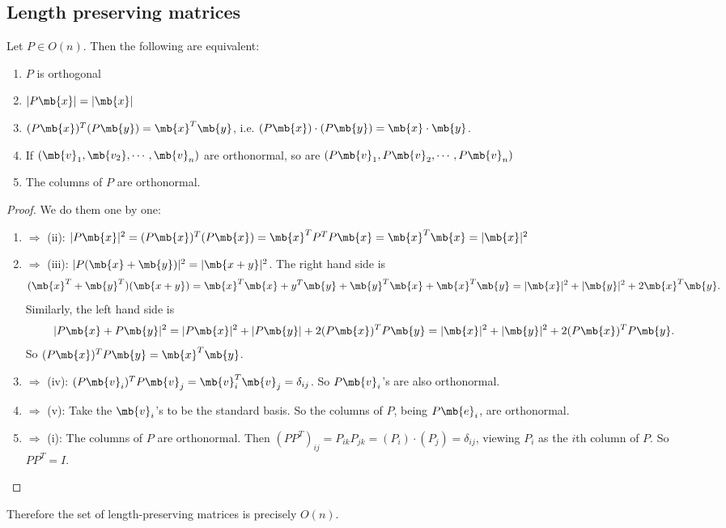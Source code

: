 \documentclass[a4paper]{article}
\begin{document}
\subsection{Length preserving matrices}
\begin{thm}
  Let $P\in O(n)$. Then the following are equivalent:
  \begin{enumerate}
    \item $P$ is orthogonal
    \item $|P\mb{x}| = |\mb{x}|$
    \item $(P\mb{x})^T(P\mb{y}) = \mb{x}^T\mb{y}$, i.e. $(P\mb{x})\cdot(P\mb{y}) = \mb{x}\cdot \mb{y}$.
    \item If $(\mb{v}_1, \mb{v_2}, \cdots, \mb{v}_n)$ are orthonormal, so are $(P\mb{v}_1, P\mb{v}_2, \cdots, P\mb{v}_n)$
    \item The columns of $P$ are orthonormal. 
  \end{enumerate}
\end{thm}

\begin{proof}
  We do them one by one:
  \begin{enumerate}
  \item $\Rightarrow$ (ii): $|P\mb{x}|^2 = (P\mb{x})^T(P\mb{x}) = \mb{x}^TP^TP\mb{x} = \mb{x}^T\mb{x} = |\mb{x}|^2$
  \item $\Rightarrow$ (iii): $|P(\mb{x} + \mb{y})|^2 = |\mb{x + y}|^2$. The right hand side is
    \[
    (\mb{x}^T + \mb{y}^T)(\mb{x + y}) = \mb{x}^T\mb{x} + y^T\mb{y} + \mb{y}^T\mb{x} + \mb{x}^T\mb{y} = |\mb{x}|^2 + |\mb{y}|^2  + 2\mb{x}^T\mb{y}.
    \]
    Similarly, the left hand side is
    \[
    |P\mb{x} + P\mb{y}|^2 = |P\mb{x}|^2 + |P\mb{y}| + 2(P\mb{x})^TP\mb{y} = |\mb{x}|^2 + |\mb{y}|^2 + 2(P\mb{x})^TP\mb{y}.
    \]
    So $(P\mb{x})^TP\mb{y} = \mb{x}^T\mb{y}$.
  \item $\Rightarrow$ (iv): $(P\mb{v}_i)^TP\mb{v}_j = \mb{v}_i^T\mb{v}_j = \delta_{ij}$. So $P\mb{v}_i$'s are also orthonormal.
  \item $\Rightarrow$ (v): Take the $\mb{v}_i$'s to be the standard basis. So the columns of $P$, being $P\mb{e}_i$, are orthonormal.
  \item $\Rightarrow$ (i): The columns of $P$ are orthonormal. Then $(PP^T)_{ij} = P_{ik}P_{jk} = (P_i)\cdot (P_j) = \delta_{ij}$, viewing $P_i$ as the $i$th column of $P$. So $PP^T = I$.
  \end{enumerate}
\end{proof}

Therefore the set of length-preserving matrices is precisely $O(n)$.
\end{document}
